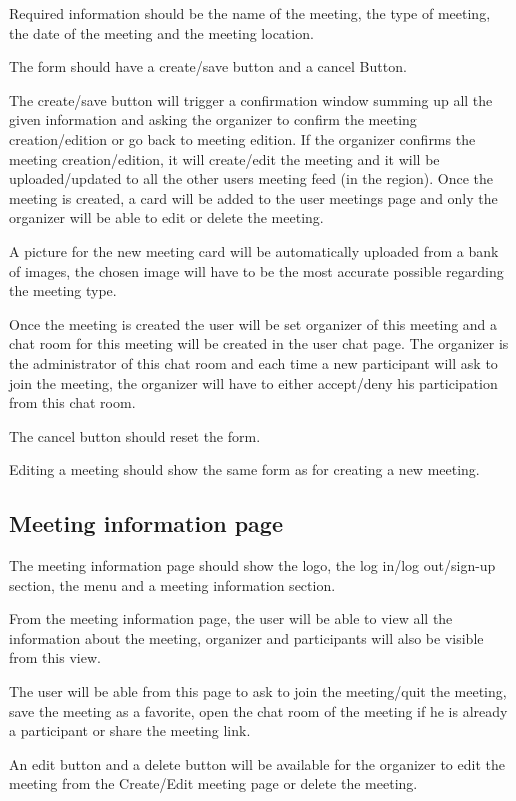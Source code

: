 \documentclass[conference]{IEEEtran}
\begin{document}
Required information should be the name of the meeting, the type of meeting, the date of the meeting and the meeting location.

The form should have a create/save button and a cancel Button.

The create/save button will trigger a confirmation window summing up all the given information and asking the organizer to confirm the meeting creation/edition or go back to meeting edition.
If the organizer confirms the meeting creation/edition, it will create/edit the meeting and it will be uploaded/updated to all the other users meeting feed (in the region).
Once the meeting is created, a card will be added to the user meetings page and only the organizer will be able to edit or delete the meeting.

A picture for the new meeting card will be automatically uploaded from a bank of images, the chosen image will have to be the most accurate possible regarding the meeting type.

Once the meeting is created the user will be set organizer of this meeting and a chat room for this meeting will be created in the user chat page.
The organizer is the administrator of this chat room and each time a new participant will ask to join the meeting, the organizer will have to either accept/deny his participation from this chat room.

The cancel button should reset the form.

Editing a meeting should show the same form as for creating a new meeting.

\subsection{Meeting information page}

The meeting information page should show the logo, the log in/log out/sign-up section, the menu and a meeting information section.

From the meeting information page, the user will be able to view all the information about the meeting, organizer and participants will also be visible from this view.

The user will be able from this page to ask to join the meeting/quit the meeting, save the meeting as a favorite, open the chat room of the meeting if he is already a participant or share the meeting link.

An edit button and a delete button will be available for the organizer to edit the meeting from the Create/Edit meeting page or delete the meeting.
\end{document}
